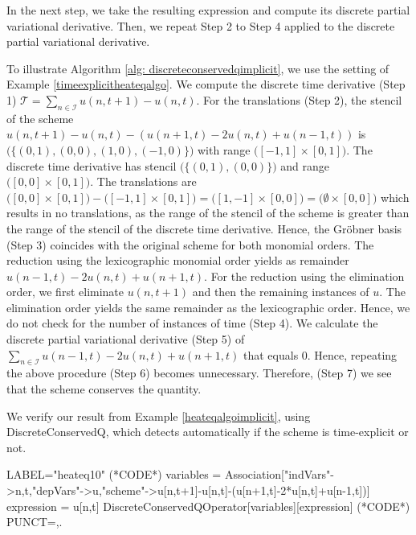 \documentclass[runningheads]{llncs}
\newcommand{\1}{\chi}
\newcommand{\Ii}{\mathcal{I}}
\begin{document}
In the next step, we take the resulting expression and compute its discrete partial variational derivative. Then, we repeat Step 2 to Step 4 applied to the discrete partial variational derivative.
\begin{example}
	\label{heateqalgoimplicit}
	To illustrate Algorithm \ref{alg: discreteconservedqimplicit}, we use the setting of Example \ref{timeexplicitheateqalgo}.
	We compute the discrete time derivative (Step 1)
$
		\mathcal{T}=\sum_{n\in\Ii} u(n,t+1)-u(n,t).
$
	For the translations (Step 2), the stencil of the scheme
$
		u(n,t+1)-u(n,t)-(u(n+1,t)-2u(n,t)+u(n-1,t))
$
	is
	$
	\Big(\big\{(0,1),(0,0),(1,0),(-1,0)\big\}\Big)
	$
	with range \small$\Big([-1,1]\times[0,1]\Big)$\normalsize.
	The discrete time derivative has stencil \small$\Big(\big\{(0,1),(0,0)\big\}\Big)$\normalsize 
	and range \small$\Big([0,0]\times[0,1]\Big)$\normalsize.
	The translations are
$
		\Big([0,0]\times[0,1]\Big)-\Big([-1,1]\times[0,1]\Big)=\Big([1,-1]\times[0,0]\Big)=\Big(\emptyset\times[0,0]\Big)
$
	which results in no translations, as the range of the stencil of the scheme is greater than the range of the stencil of the discrete time derivative.
	Hence, the Gr{\"o}bner basis (Step 3) coincides with the original scheme for both monomial orders.
	The reduction using the lexicographic monomial order yields as remainder
$
		u(n-1,t)-2u(n,t)+u(n+1,t).
$
	For the reduction using the elimination order, we first eliminate $u(n,t+1)$ and then the remaining instances of $u$.
	The elimination order yields the same remainder as the lexicographic order. Hence, we do not check for the number of instances of time (Step 4).
	We calculate the discrete partial variational derivative (Step 5) of
$
		\sum_{n\in\Ii}u(n-1,t)-2u(n,t)+u(n+1,t)
$
	that equals $0$.
	Hence, repeating the above procedure (Step 6) becomes unnecessary.
	Therefore, (Step 7) we see that the scheme conserves the quantity.
\end{example}
\begin{example}
	We verify our result from Example \ref{heateqalgoimplicit}, using {\sc DiscreteConservedQ}, which detects automatically if the scheme is time-explicit or not.
	\begin{EXE}
		LABEL="heateq10"
		(*CODE*)
		variables = Association["indVars"->{n,t},"depVars"->{u},"scheme"->{u[n,t+1]-u[n,t]-(u[n+1,t]-2*u[n,t]+u[n-1,t])}]
		expression = u[n,t]
		DiscreteConservedQOperator[variables][expression]
		(*CODE*)
		PUNCT={,.}
	\end{EXE}
	\begin{small}
		
		
	\end{small}
\end{example}
\end{document}
